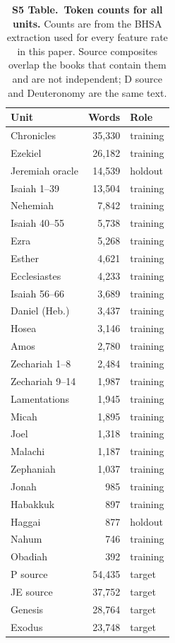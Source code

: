 \documentclass[10pt,letterpaper]{article}
\begin{document}
\begin{table}[!ht]
\centering
\caption{\textbf{S5 Table.\ Token counts for all units.}
Counts are from the BHSA extraction used for every feature rate in this paper.
Source composites overlap the books that contain them and are not independent;
D source and Deuteronomy are the same text.}
\begin{tabular}{lrl}
\hline
\textbf{Unit} & \textbf{Words} & \textbf{Role} \\
\hline
Chronicles & 35{,}330 & training \\
Ezekiel & 26{,}182 & training \\
Jeremiah oracle & 14{,}539 & holdout \\
Isaiah 1--39 & 13{,}504 & training \\
Nehemiah & 7{,}842 & training \\
Isaiah 40--55 & 5{,}738 & training \\
Ezra & 5{,}268 & training \\
Esther & 4{,}621 & training \\
Ecclesiastes & 4{,}233 & training \\
Isaiah 56--66 & 3{,}689 & training \\
Daniel (Heb.) & 3{,}437 & training \\
Hosea & 3{,}146 & training \\
Amos & 2{,}780 & training \\
Zechariah 1--8 & 2{,}484 & training \\
Zechariah 9--14 & 1{,}987 & training \\
Lamentations & 1{,}945 & training \\
Micah & 1{,}895 & training \\
Joel & 1{,}318 & training \\
Malachi & 1{,}187 & training \\
Zephaniah & 1{,}037 & training \\
Jonah & 985 & training \\
Habakkuk & 897 & training \\
Haggai & 877 & holdout \\
Nahum & 746 & training \\
Obadiah & 392 & training \\
\hline
P source & 54{,}435 & target \\
JE source & 37{,}752 & target \\
Genesis & 28{,}764 & target \\
Exodus & 23{,}748 & target \\

\end{tabular}
\end{table}
\end{document}

